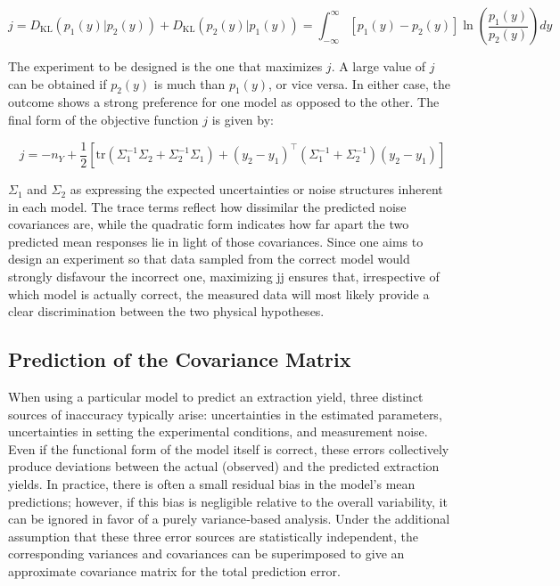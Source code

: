\documentclass[../Article_Design_of_Experiment.tex]{subfiles}
\begin{document}
	{\footnotesize 
		\begin{equation} 
			j = D_{\mathrm{KL}}\left( p_1(y) | p_2(y) \right) + D_{\mathrm{KL}}\left( p_2(y) | p_1(y) \right) = \int_{-\infty}^{\infty} \left[ p_1(y) - p_2(y) \right] \ln\left( \frac{p_1(y)}{p_2(y)} \right) dy 
	\end{equation} }
	
	The experiment to be designed is the one that maximizes $j$. A large value of $j$ can be obtained if $p_2(y)$ is much than $p_1(y)$, or vice versa. In either case, the outcome shows a strong preference for one model as opposed to the other. The final form of the objective function $j$ is given by:
	
	{\footnotesize \begin{equation} j = -n_Y + \frac{1}{2} \left[ \mathrm{tr}\left( \Sigma_1^{-1} \Sigma_2 + \Sigma_2^{-1} \Sigma_1 \right) + (y_2 - y_1)^\top \left( \Sigma_1^{-1} + \Sigma_2^{-1} \right) (y_2 - y_1) \right] \end{equation} }
	
	$\Sigma_1$ and $\Sigma_2$ as expressing the expected uncertainties or noise structures inherent in each model. The trace terms reflect how dissimilar the predicted noise covariances are, while the quadratic form indicates how far apart the two predicted mean responses lie in light of those covariances. Since one aims to design an experiment so that data sampled from the correct model would strongly disfavour the incorrect one, maximizing jj ensures that, irrespective of which model is actually correct, the measured data will most likely provide a clear discrimination between the two physical hypotheses.
	
	\subsection{Prediction of the Covariance Matrix}
	
	When using a particular model to predict an extraction yield, three distinct sources of inaccuracy typically arise: uncertainties in the estimated parameters, uncertainties in setting the experimental conditions, and measurement noise. Even if the functional form of the model itself is correct, these errors collectively produce deviations between the actual (observed) and the predicted extraction yields. In practice, there is often a small residual bias in the model’s mean predictions; however, if this bias is negligible relative to the overall variability, it can be ignored in favor of a purely variance‐based analysis. Under the additional assumption that these three error sources are statistically independent, the corresponding variances and covariances can be superimposed to give an approximate covariance matrix for the total prediction error.
	
\end{document}
